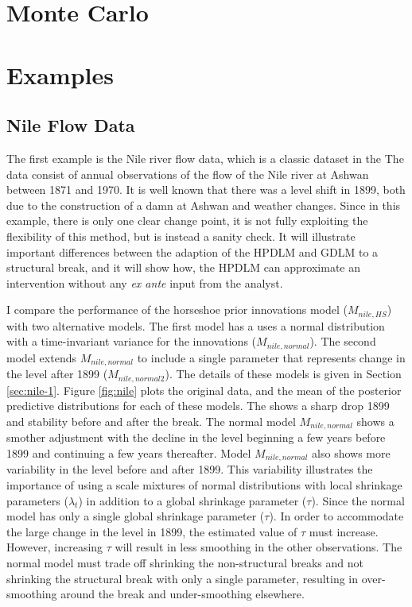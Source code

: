 \documentclass{article}
\begin{document}
\section{Monte Carlo}
\label{sec:monte-carlo}

\section{Examples}
\label{sec:examples}

\subsection{Nile Flow Data}
\label{sec:nile}

The first example is the Nile river flow data, which is a classic dataset in the  \parencites{Cobb1978}{Balke1993}{JongPenzer1998}{DurbinKoopman2001}{DurbinKoopman2012}
The data consist of annual observations of the flow of the Nile river at Ashwan between 1871 and 1970.
It is well known that there was a level shift in 1899, both due to the construction of a damn at Ashwan and weather changes.
Since in this example, there is only one clear change point, it is not fully exploiting the flexibility of this method, but is instead a sanity check.
It will illustrate important differences between the adaption of the HPDLM and GDLM to a structural break,
and it will show how, the HPDLM can approximate an intervention without any \textit{ex ante} input from the analyst.

I compare the performance of the horseshoe prior innovations model ($M_{nile,HS}$) with two alternative models.
The first model has a uses a normal distribution with a time-invariant variance for the innovations ($M_{nile,normal}$).
The second model extends $M_{nile,normal}$ to include a single parameter that represents change in the level after 1899 ($M_{nile,normal2}$).
The details of these models is given in Section \ref{sec:nile-1}.
Figure \ref{fig:nile} plots the original data, and the mean of the posterior predictive distributions for each of these models.
The  shows a sharp drop 1899 and stability before and after the break.
The normal model $M_{nile,normal}$ shows a smother adjustment with the decline in the level beginning a few years before 1899 and continuing a few years thereafter.
Model $M_{nile,normal}$ also shows more variability in the level before and after 1899.
This variability illustrates the importance of using a scale mixtures of normal distributions with local shrinkage parameters ($\lambda_{t}$) in addition to a global shrinkage parameter ($\tau$).
Since the normal model has only a single global shrinkage parameter ($\tau$). 
In order to accommodate the large change in the level in 1899, the estimated value of $\tau$ must increase.
However, increasing $\tau$ will result in less smoothing in the other observations.
The normal model must trade off shrinking the non-structural breaks and not shrinking the structural break with only a single parameter, resulting in over-smoothing around the break and under-smoothing elsewhere.
\end{document}
